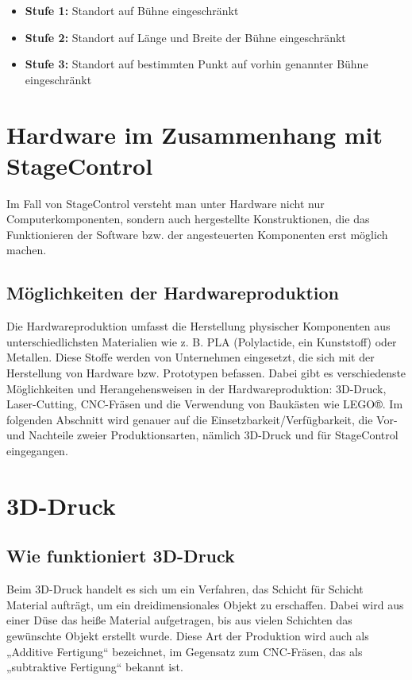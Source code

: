 \begin{itemize}
	\item \textbf{Stufe 1: }Standort auf Bühne eingeschränkt
	\item \textbf{Stufe 2: }Standort auf Länge und Breite der Bühne eingeschränkt
	\item \textbf{Stufe 3: }Standort auf bestimmten Punkt auf vorhin genannter Bühne eingeschränkt
\end{itemize}

\section{Hardware im Zusammenhang mit StageControl}
Im Fall von StageControl versteht man unter Hardware nicht nur Computerkomponenten, sondern auch hergestellte Konstruktionen, die das Funktionieren der Software bzw. der angesteuerten Komponenten erst möglich machen.

\subsection{Möglichkeiten der Hardwareproduktion}
Die Hardwareproduktion umfasst die Herstellung physischer Komponenten aus unterschiedlichsten Materialien wie z. B. PLA (Polylactide, ein Kunststoff) oder Metallen. Diese Stoffe werden von Unternehmen eingesetzt, die sich mit der Herstellung von Hardware bzw. Prototypen befassen. Dabei gibt es verschiedenste Möglichkeiten und Herangehensweisen in der Hardwareproduktion: 3D-Druck, Laser-Cutting, CNC-Fräsen und die Verwendung von Baukästen wie LEGO®. Im folgenden Abschnitt wird genauer auf die Einsetzbarkeit/Verfügbarkeit, die Vor- und Nachteile zweier Produktionsarten, nämlich 3D-Druck und  für StageControl eingegangen.

\section{3D-Druck}
\subsection{Wie funktioniert 3D-Druck}
Beim 3D-Druck handelt es sich um ein Verfahren, das Schicht für Schicht Material aufträgt, um ein dreidimensionales Objekt zu erschaffen. Dabei wird aus einer Düse das heiße Material aufgetragen, bis aus vielen Schichten das gewünschte Objekt erstellt wurde. Diese Art der Produktion wird auch als „Additive Fertigung“ bezeichnet, im Gegensatz zum CNC-Fräsen, das als „subtraktive Fertigung“ bekannt ist.

